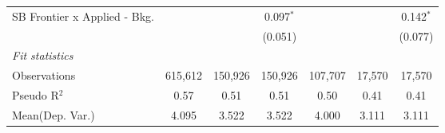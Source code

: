 \begin{tabular}{lcccccc}
   SB Frontier x Applied - Bkg.   &               &              & 0.097$^{*}$   &               &         & 0.142$^{*}$\\   
                                  &               &              & (0.051)       &               &         & (0.077)\\   
   \midrule
   \emph{Fit statistics}\\
   Observations                   & 615,612       & 150,926      & 150,926       & 107,707       & 17,570  & 17,570\\  
   Pseudo R$^2$                   & 0.57          & 0.51         & 0.51          & 0.50          & 0.41    & 0.41\\  
Mean(Dep. Var.) & 4.095 & 3.522 & 3.522 & 4.000 & 3.111 & 3.111 \\
   

\end{tabular}
